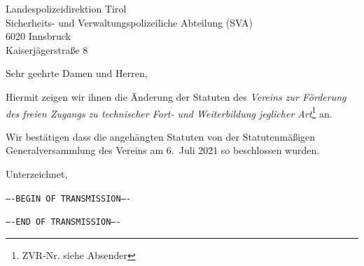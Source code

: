 \documentclass[a4paper,DIV=15,parskip=full,10pt]{scrartcl}
\begin{document}
\begin{letter}{Landespolizeidirektion Tirol\\Sicherheits- und Verwaltungspolizeiliche Abteilung (SVA)\\6020 Innsbruck\\Kaiserjägerstraße 8}
  \opening{Sehr geehrte Damen und Herren,}

  Hiermit zeigen wir ihnen die Änderung der Statuten des \textit{Vereins
    zur Förderung des freien Zugangs zu technischer Fort- und Weiterbildung
    jeglicher Art}\footnote{ZVR-Nr. siehe Absender} an.

  Wir bestätigen dass die angehängten Statuten von der Statutenmäßigen
  Generalversammlung des Vereins am 6.~Juli 2021 so beschlossen wurden.


\closing{Unterzeichnet,}

\afterpage{\null\thispagestyle{empty}\addtocounter{page}{-1}\newpage}

\setcounter{page}{0}
\newpage
\texttt{----BEGIN OF TRANSMISSION----}



\vspace{1em}
\texttt{----END OF TRANSMISSION----}

\end{letter}
\end{document}
